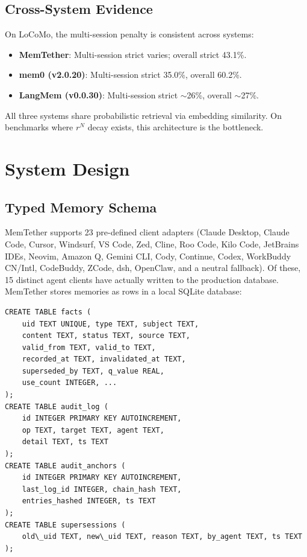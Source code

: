\documentclass{article}
\begin{document}
\subsection{Cross-System Evidence}

On LoCoMo, the multi-session penalty is consistent across systems:

\begin{itemize}
\item \textbf{MemTether}: Multi-session strict varies; overall strict 43.1\%.
\item \textbf{mem0 (v2.0.20)}: Multi-session strict 35.0\%, overall 60.2\%.
\item \textbf{LangMem (v0.0.30)}: Multi-session strict $\sim$26\%, overall $\sim$27\%.
\end{itemize}

All three systems share probabilistic retrieval via embedding similarity. On benchmarks where $r^N$ decay exists, this architecture is the bottleneck.
\section{System Design}
\label{sec:design}

\subsection{Typed Memory Schema}
MemTether supports 23 pre-defined client adapters (Claude Desktop, Claude Code, Cursor, Windsurf, VS Code, Zed, Cline, Roo Code, Kilo Code, JetBrains IDEs, Neovim, Amazon Q, Gemini CLI, Cody, Continue, Codex, WorkBuddy CN/Intl, CodeBuddy, ZCode, dsh, OpenClaw, and a neutral fallback). Of these, 15 distinct agent clients have actually written to the production database. MemTether stores memories as rows in a local SQLite database:

\begin{verbatim}
CREATE TABLE facts (
    uid TEXT UNIQUE, type TEXT, subject TEXT,
    content TEXT, status TEXT, source TEXT,
    valid_from TEXT, valid_to TEXT,
    recorded_at TEXT, invalidated_at TEXT,
    superseded_by TEXT, q_value REAL,
    use_count INTEGER, ...
);
CREATE TABLE audit_log (
    id INTEGER PRIMARY KEY AUTOINCREMENT,
    op TEXT, target TEXT, agent TEXT,
    detail TEXT, ts TEXT
);
CREATE TABLE audit_anchors (
    id INTEGER PRIMARY KEY AUTOINCREMENT,
    last_log_id INTEGER, chain_hash TEXT,
    entries_hashed INTEGER, ts TEXT
);
CREATE TABLE supersessions (
    old\_uid TEXT, new\_uid TEXT, reason TEXT, by_agent TEXT, ts TEXT
);
\end{verbatim}
\end{document}
